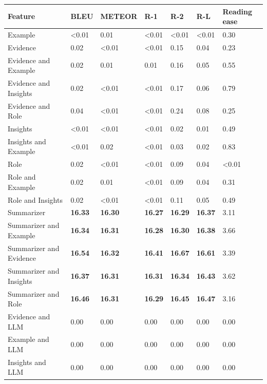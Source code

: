 \begin{tabular}{|l|l|l|l|l|l|l|}
\hline
\textbf{Feature} & BLEU & METEOR & R-1 & R-2 & R-L & Reading ease \\
 \hline
 Example & \textless{}0.01 & 0.01 & \textless{}0.01 & \textless{}0.01 & \textless{}0.01 & 0.30 \\
 \hline
 Evidence & 0.02 & \textless{}0.01 & \textless{}0.01 & 0.15 & 0.04 & 0.23 \\
 \hline
 Evidence and Example & 0.02 & 0.01 & 0.01 & 0.16 & 0.05 & 0.55 \\
 \hline
 Evidence and Insights & 0.02 & \textless{}0.01 & \textless{}0.01 & 0.17 & 0.06 & 0.79 \\
 \hline
 Evidence and Role & 0.04 & \textless{}0.01 & \textless{}0.01 & 0.24 & 0.08 & 0.25 \\
 \hline
 Insights & \textless{}0.01 & \textless{}0.01 & \textless{}0.01 & 0.02 & 0.01 & 0.49 \\
 \hline
 Insights and Example & \textless{}0.01 & 0.02 & \textless{}0.01 & 0.03 & 0.02 & 0.83 \\
 \hline
 Role & 0.02 & \textless{}0.01 & \textless{}0.01 & 0.09 & 0.04 & \textless{}0.01 \\
 \hline
 Role and Example & 0.02 & 0.01 & \textless{}0.01 & 0.09 & 0.04 & 0.31 \\
 \hline
 Role and Insights & 0.02 & \textless{}0.01 & \textless{}0.01 & 0.11 & 0.05 & 0.49 \\
 \hline
 Summarizer & \textbf{16.33} & \textbf{16.30} & \textbf{16.27} & \textbf{16.29} & \textbf{16.37} & 3.11 \\
 \hline
 Summarizer and Example & \textbf{16.34} & \textbf{16.31} & \textbf{16.28} & \textbf{16.30} & \textbf{16.38} & 3.66 \\
 \hline
 Summarizer and Evidence & \textbf{16.54} & \textbf{16.32} & \textbf{16.41} & \textbf{16.67} & \textbf{16.61} & 3.39 \\
 \hline
 Summarizer and Insights & \textbf{16.37} & \textbf{16.31} & \textbf{16.31} & \textbf{16.34} & \textbf{16.43} & 3.62 \\
 \hline
 Summarizer and Role & \textbf{16.46} & \textbf{16.31} & \textbf{16.29} & \textbf{16.45} & \textbf{16.47} & 3.16 \\
 \hline
 Evidence and LLM & 0.00 & 0.00 & 0.00 & 0.00 & 0.00 & 0.00 \\
 \hline
 Example and LLM & 0.00 & 0.00 & 0.00 & 0.00 & 0.00 & 0.00 \\
 \hline
 Insights and LLM & 0.00 & 0.00 & 0.00 & 0.00 & 0.00 & 0.00 \\

\end{tabular}
